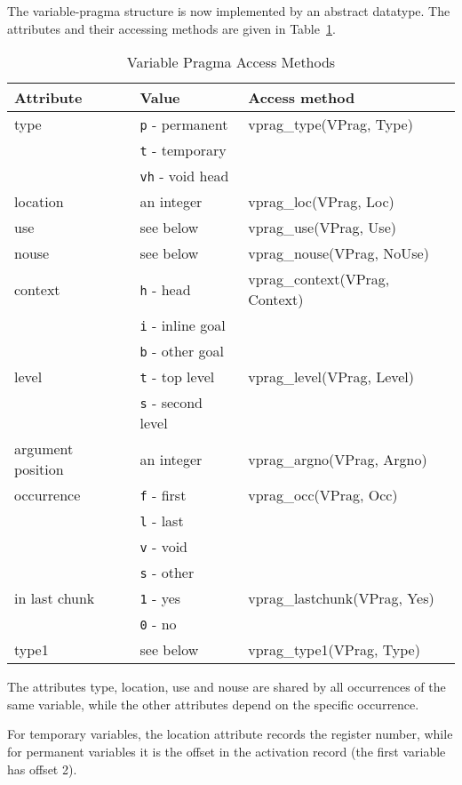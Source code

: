 The variable-pragma structure is now implemented by an abstract datatype.
The attributes and their accessing methods are given in Table~\ref{t:vprag}.

\begin{table}\centering
\begin{tabular}{|l|l|l|}
\hline
Attribute	& Value			& Access method			\\
\hline \hline
{\sf type}	& {\tt p} - permanent	& vprag\_type(VPrag, Type)	\\
		& {\tt t} - temporary	&				\\
		& {\tt vh} - void head	&				\\
{\sf location}	& an integer		& vprag\_loc(VPrag, Loc)	\\
{\sf use}	& see below		& vprag\_use(VPrag, Use)	\\
{\sf nouse}	& see below		& vprag\_nouse(VPrag, NoUse)	\\
\hline
{\sf context}	& {\tt h} - head	& vprag\_context(VPrag, Context)\\
		& {\tt i} - inline goal &				\\
		& {\tt b} - other goal	&				\\
{\sf level}	& {\tt t} - top	level	& vprag\_level(VPrag, Level)	\\
		& {\tt s} - second level&				\\
{\sf argument
     position}	& an integer		& vprag\_argno(VPrag, Argno)	\\
{\sf occurrence}& {\tt f} - first	& vprag\_occ(VPrag, Occ)	\\
		& {\tt l} - last	& 				\\
		& {\tt v} - void	& 				\\
		& {\tt s} - other	& 				\\
{\sf in last
     chunk}	& {\tt 1} - yes		& vprag\_lastchunk(VPrag, Yes)	\\
		& {\tt 0} - no		&				\\
\hline
{\sf type1}	& see below		& vprag\_type1(VPrag, Type)     \\
\hline
\end{tabular}
\caption{Variable Pragma Access Methods}
\label{t:vprag}
\end{table}

The attributes {\sf type, location, use} and {\sf nouse} are shared
by all occurrences of the same variable, while the other attributes
depend on the specific occurrence.

For temporary variables, the {\sf location} attribute records the
register number, while for permanent variables it is the offset in
the activation record (the first variable has offset 2).

